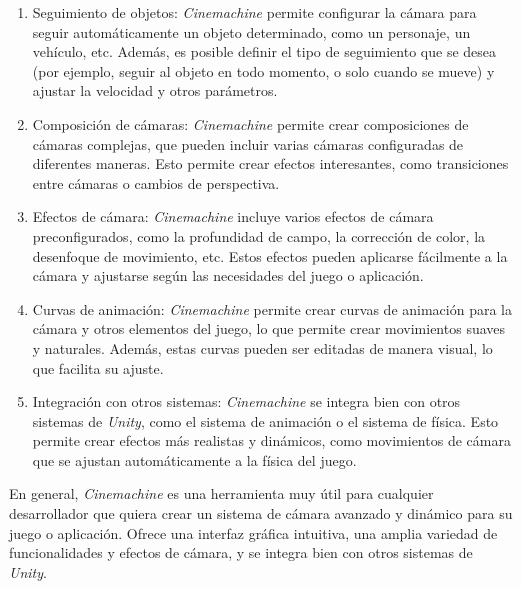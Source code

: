 \begin{enumerate}
\item Seguimiento de objetos: \textit{Cinemachine} permite configurar la cámara para seguir automáticamente un objeto determinado, como un personaje, un vehículo, etc. Además, es posible definir el tipo de seguimiento que se desea (por ejemplo, seguir al objeto en todo momento, o solo cuando se mueve) y ajustar la velocidad y otros parámetros.

\item Composición de cámaras: \textit{Cinemachine} permite crear composiciones de cámaras complejas, que pueden incluir varias cámaras configuradas de diferentes maneras. Esto permite crear efectos interesantes, como transiciones entre cámaras o cambios de perspectiva.

\item Efectos de cámara: \textit{Cinemachine} incluye varios efectos de cámara preconfigurados, como la profundidad de campo, la corrección de color, la desenfoque de movimiento, etc. Estos efectos pueden aplicarse fácilmente a la cámara y ajustarse según las necesidades del juego o aplicación.

\item Curvas de animación: \textit{Cinemachine} permite crear curvas de animación para la cámara y otros elementos del juego, lo que permite crear movimientos suaves y naturales. Además, estas curvas pueden ser editadas de manera visual, lo que facilita su ajuste.

\item Integración con otros sistemas: \textit{Cinemachine} se integra bien con otros sistemas de \textit{Unity}, como el sistema de animación o el sistema de física. Esto permite crear efectos más realistas y dinámicos, como movimientos de cámara que se ajustan automáticamente a la física del juego.

\end{enumerate}

En general, \textit{Cinemachine} es una herramienta muy útil para cualquier desarrollador que quiera crear un sistema de cámara avanzado y dinámico para su juego o aplicación. Ofrece una interfaz gráfica intuitiva, una amplia variedad de funcionalidades y efectos de cámara, y se integra bien con otros sistemas de \textit{Unity}.

